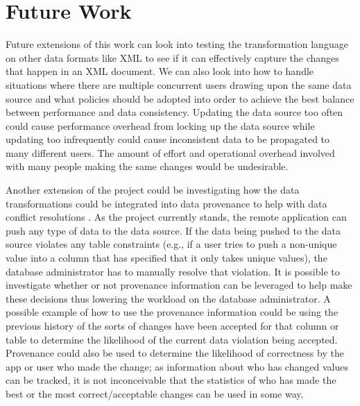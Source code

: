 \documentclass[12pt]{article}
\begin{document}
\section{Future Work}
Future extensions of this work can look into testing the transformation language on other data formats like XML to see if it can effectively capture the changes that happen in an XML document. We can also look into how to handle situations where there are multiple concurrent users drawing upon the same data source and what policies should be adopted into order to achieve the best balance between performance and data consistency. Updating the data source too often could cause performance overhead from locking up the data source while updating too infrequently could cause inconsistent data to be propagated to many different users. The amount of effort and operational overhead involved with many people making the same changes would be undesirable. 

Another extension of the project could be investigating how the data transformations could be integrated into data provenance to help with data conflict resolutions \cite{arniThesis}. As the project currently stands, the remote application can push any type of data to the data source. If the data being pushed to the data source violates any table constraints (e.g., if a user tries to push a non-unique value into a column that has specified that it only takes unique values), the database administrator has to manually resolve that violation. It is possible to investigate whether or not provenance information can be leveraged to help make these decisions thus lowering the workload on the database administrator. A possible example of how to use the provenance information could be using the previous history of the sorts of changes have been accepted for that column or table to determine the likelihood of the current data violation being accepted. Provenance could also be used to determine the likelihood of correctness by the app or user who made the change; as information about who has changed values can be tracked, it is not inconceivable that the statistics of who has made the best or the most correct/acceptable changes can be used in some way.



\end{document}
